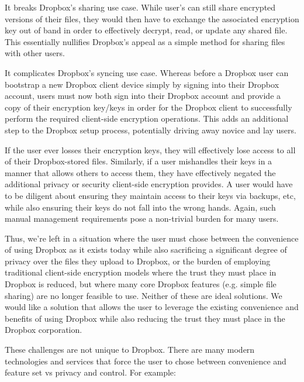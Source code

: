 \begin{packed_enum}
\item It breaks Dropbox's sharing use case. While user's can still
  share encrypted versions of their files, they would then have to
  exchange the associated encryption key out of band in order to
  effectively decrypt, read, or update any shared file. This
  essentially nullifies Dropbox's appeal as a simple method for
  sharing files with other users.
\item It complicates Dropbox's syncing use case. Whereas before a
  Dropbox user can bootstrap a new Dropbox client device simply by
  signing into their Dropbox account, users must now both sign into
  their Dropbox account and provide a copy of their encryption
  key/keys in order for the Dropbox client to successfully perform the
  required client-side encryption operations. This adds an additional
  step to the Dropbox setup process, potentially driving away novice
  and lay users.
\item If the user ever losses their encryption keys, they will
  effectively lose access to all of their Dropbox-stored
  files. Similarly, if a user mishandles their keys in a manner that
  allows others to access them, they have effectively negated the
  additional privacy or security client-side encryption provides. A
  user would have to be diligent about ensuring they maintain access
  to their keys via backups, etc, while also ensuring their keys do
  not fall into the wrong hands. Again, such manual management
  requirements pose a non-trivial burden for many users.
\end{packed_enum}

Thus, we're left in a situation where the user must chose between the
convenience of using Dropbox as it exists today while also sacrificing
a significant degree of privacy over the files they upload to Dropbox,
or the burden of employing traditional client-side encryption models
where the trust they must place in Dropbox is reduced, but where many
core Dropbox features (e.g. simple file sharing) are no longer
feasible to use. Neither of these are ideal solutions. We would like a
solution that allows the user to leverage the existing convenience and
benefits of using Dropbox while also reducing the trust they must
place in the Dropbox corporation.

These challenges are not unique to Dropbox. There are many modern
technologies and services that force the user to chose between
convenience and feature set vs privacy and control. For example:

